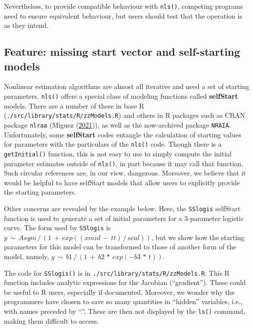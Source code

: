 \documentclass[
]{article}
\begin{document}
Nevertheless, to provide compatible behaviour with \texttt{nls()},
competing programs need to ensure equivalent behaviour, but users should
test that the operation is as they intend.

\hypertarget{feature-missing-start-vector-and-self-starting-models}{%
\subsection{Feature: missing start vector and self-starting
models}\label{feature-missing-start-vector-and-self-starting-models}}

Nonlinear estimation algorithms are almost all iterative and need a set
of starting parameters. \texttt{nls()} offers a special class of
modeling functions called \textbf{selfStart} models. There are a number
of these in base R (\texttt{./src/library/stats/R/zzModels.R}) and
others in R packages such as CRAN package \texttt{nlraa} (Miguez
(\protect\hyperlink{ref-MiguezNLRAA2021}{2021})), as well as the
now-archived package \texttt{NRAIA}. Unfortunately, some
\textbf{selfStart} codes entangle the calculation of starting values for
parameters with the particulars of the \texttt{nls()} code. Though there
is a \texttt{getInitial()} function, this is not easy to use to simply
compute the initial parameter estimates outside of \texttt{nls()}, in
part because it may call that function. Such circular references are, in
our view, dangerous. Moreover, we believe that it would be helpful to
have selfStart models that allow users to explicitly provide the
starting parameters.

Other concerns are revealed by the example below. Here, the
\texttt{SSlogis} selfStart function is used to generate a set of initial
parameters for a 3-parameter logistic curve. The form used by
\texttt{SSlogis} is
\(y \,\sim\, Asym\,/\, (1 \,+\, exp((xmid\,-\,tt)\,/\,scal))\), but we
show how the starting parameters for this model can be transformed to
those of another form of the model, namely,
\(y \,\sim\, b1\,/\,(1 \,+\, b2\,*\,exp(-b3\,*\,t))\).

The code for \texttt{SSlogis()} is in
\texttt{./src/library/stats/R/zzModels.R}. This R function includes
analytic expressions for the Jacobian (``gradient''). These could be
useful to R users, especially if documented. Moreover, we wonder why the
programmers have chosen to save so many quantities in ``hidden''
variables, i.e., with names preceded by ``.''. These are then not
displayed by the \texttt{ls()} command, making them difficult to access.
\end{document}
